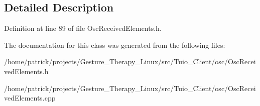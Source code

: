 \subsection{Detailed Description}


Definition at line 89 of file Osc\+Received\+Elements.\+h.



The documentation for this class was generated from the following files\+:\begin{DoxyCompactItemize}
\item 
/home/patrick/projects/\+Gesture\+\_\+\+Therapy\+\_\+\+Linux/src/\+Tuio\+\_\+\+Client/osc/Osc\+Received\+Elements.\+h\item 
/home/patrick/projects/\+Gesture\+\_\+\+Therapy\+\_\+\+Linux/src/\+Tuio\+\_\+\+Client/osc/Osc\+Received\+Elements.\+cpp\end{DoxyCompactItemize}
